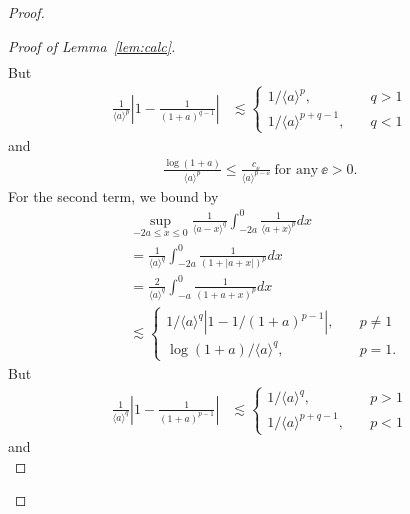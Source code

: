 \begin{proof}
\begin{proof}[Proof of Lemma~\ref{lem:calc}]
\begin{equation*}
\begin{split}
\end{split}
\end{equation*}
%
But
%
%
\begin{equation*}
\begin{split}
\frac{1}{\langle a \rangle ^{p}}\left| 1 - \frac{1}{(1 +
a)^{q -1}} \right|
& \lesssim
\begin{cases}
1/{\langle a \rangle^{p} }, \quad & q > 1
\\
1/{\langle a \rangle ^{p + q -1}}, \quad & q < 1
\end{cases}
\end{split}
\end{equation*}
%
%
and
%
%
\begin{equation*}
\begin{split}
\frac{\log(1 + a)}{\langle a \rangle^{p} } \le  \frac{c_{\ee}}{\langle a
\rangle ^{p - \ee}} \ \text{for any} \ \ee > 0.
\end{split}
\end{equation*}
%
For the second term, we bound by
%
%
\begin{equation*}
\begin{split}
& \sup_{-2a \le x \le 0} \frac{1}{\langle a - x \rangle
^{q}} \int_{-2a}^{0} \frac{1}{\langle a + x \rangle ^{p}} d x
\\
& = \frac{1}{\langle a \rangle ^{q}} \int_{-2a}^{0} \frac{1}{(1 + | a +
x
|)^{p}} d x 
\\
& = \frac{2}{\langle a \rangle ^{q}} \int_{-a}^{0} \frac{1}{(1 + a +
x)^{p}} d x
\\
& \lesssim
\begin{cases}
1/{\langle a \rangle ^{q}} \left| 1 - 1/{(1 +
a)^{p -1}} \right|, \quad & p \neq 1
\\
\log(1+a)/{\langle a \rangle^{q} }, \quad & p =1.
\end{cases}
\end{split}
\end{equation*}
%
But
%
%
\begin{equation*}
\begin{split}
\frac{1}{\langle a \rangle ^{q}}\left| 1 - \frac{1}{(1 +
a)^{p -1}} \right|
& \lesssim
\begin{cases}
1/{\langle a \rangle ^{q}}, \quad & p > 1
\\
1/{\langle a \rangle ^{p + q -1}}, \quad & p < 1
\end{cases}
\end{split}
\end{equation*}
%
%
and
%
%
\begin{equation*}

\end{equation*}
\end{proof}
\end{proof}
